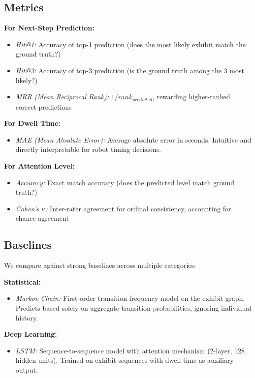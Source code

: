 \documentclass[letterpaper]{article}
\begin{document}
\subsection{Metrics}

\textbf{For Next-Step Prediction:}
\begin{itemize}
    \item \textit{Hit@1:} Accuracy of top-1 prediction (does the most likely exhibit match the ground truth?)
    \item \textit{Hit@3:} Accuracy of top-3 prediction (is the ground truth among the 3 most likely?)
    \item \textit{MRR (Mean Reciprocal Rank):} $1/rank_{predicted}$, rewarding higher-ranked correct predictions
\end{itemize}

\textbf{For Dwell Time:}
\begin{itemize}
    \item \textit{MAE (Mean Absolute Error):} Average absolute error in seconds. Intuitive and directly interpretable for robot timing decisions.
\end{itemize}

\textbf{For Attention Level:}
\begin{itemize}
    \item \textit{Accuracy:} Exact match accuracy (does the predicted level match ground truth?)
    \item \textit{Cohen's $\kappa$:} Inter-rater agreement for ordinal consistency, accounting for chance agreement
\end{itemize}

\subsection{Baselines}

We compare against strong baselines across multiple categories:

\textbf{Statistical:}
\begin{itemize}
    \item \textit{Markov Chain:} First-order transition frequency model on the exhibit graph. Predicts based solely on aggregate transition probabilities, ignoring individual history.
\end{itemize}

\textbf{Deep Learning:}
\begin{itemize}
    \item \textit{LSTM:} Sequence-to-sequence model with attention mechanism (2-layer, 128 hidden units). Trained on exhibit sequences with dwell time as auxiliary output.
\end{itemize}
\end{document}
